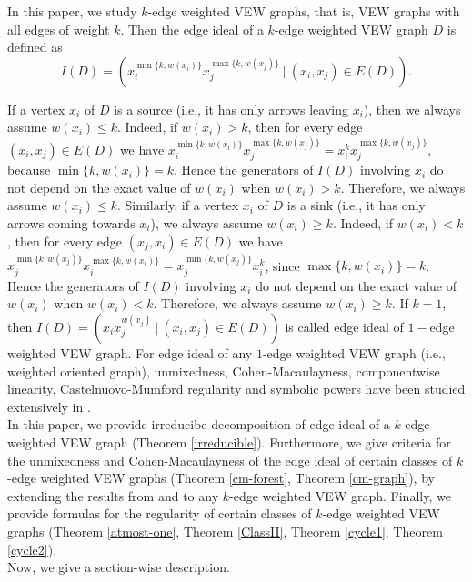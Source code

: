 \documentclass[11pt,reqno]{amsart}
\theoremstyle{definition}
\begin{document}
 
In this paper, we study {\rm $k$-edge weighted} VEW graphs, that is, VEW
graphs with all edges of weight $k$. Then the edge ideal of a $k$-edge weighted VEW graph $D$ is defined as
$$ I(D)  =  (x_i^{\min\{k,w(x_i)\}} x_j^{\max\{k,w(x_j)\}}~|~(x_i,x_j) \in E(D) ).$$



If a vertex $x_i$ of $D$ is a source (i.e., it has only arrows leaving $x_i$), then we always assume $w(x_i)\leq k$. Indeed, if $w(x_i)>k$, then for every edge $(x_i,x_j)\in E(D)$ we have 
$x_i^{\min\{k,w(x_i)\}}x_j^{\max\{k,w(x_j)\}}=x_i^{k}x_j^{\max\{k,w(x_j)\}}$, because $\min\{k,w(x_i)\}=k$. Hence the generators of $I(D)$ involving $x_i$ do not depend on the exact value of $w(x_i)$ when $w(x_i)>k$. Therefore, we always assume $w(x_i)\le k$. Similarly, if a vertex $x_i$ of $D$ is a sink (i.e., it has only arrows coming towards $x_i$), we always assume $w(x_i)\ge k$. Indeed, if $w(x_i)<k$, then for every edge $(x_j,x_i)\in E(D)$ we have
$x_j^{\min\{k,w(x_j)\}}x_i^{\max\{k,w(x_i)\}}=x_j^{\min\{k,w(x_j)\}}x_i^{k}$, since $\max\{k,w(x_i)\}=k$. Hence the generators of $I(D)$ involving $x_i$ do not depend on the exact value of $w(x_i)$ when $w(x_i)<k$. Therefore, we always assume $w(x_i)\ge k$.  If $k=1$, then $ I(D)  =  (x_i x_j^{w(x_j)}~|~(x_i,x_j) \in E(D))$ is called edge ideal of $1-$edge weighted VEW graph. For edge ideal of any $1$-edge weighted VEW graph (i.e., weighted oriented graph), unmixedness, Cohen-Macaulayness, componentwise linearity, Castelnuovo-Mumford regularity and symbolic powers have been studied extensively in \cite{kanoy1, kblo22, cpr22, gmsv18,   kumar1,kumar2, kumar3, mandal1,mandal2,mandal3,mandal4, pitones, zhu}.	
\vspace{0.2cm}\\
In this paper, we provide irreducibe decomposition of edge ideal of a $k$-edge weighted VEW graph (Theorem \ref{irreducible}). Furthermore, we give criteria for the unmixedness and Cohen-Macaulayness of the edge ideal of certain classes of $k$-edge weighted VEW graphs (Theorem \ref{cm-forest}, Theorem \ref{cm-graph}), by extending the results from \cite[Theorem 3.1]{H.T-2018} and \cite[Theorem 5]{gmsv18} to any $k$-edge weighted VEW graph. Finally, we provide formulas for the regularity of certain classes of $k$-edge weighted VEW graphs (Theorem \ref{atmost-one}, Theorem \ref{ClassII}, Theorem \ref{cycle1}, Theorem \ref{cycle2}).
\vspace{0.2cm}\\
Now, we give a section-wise description.
\end{document}
